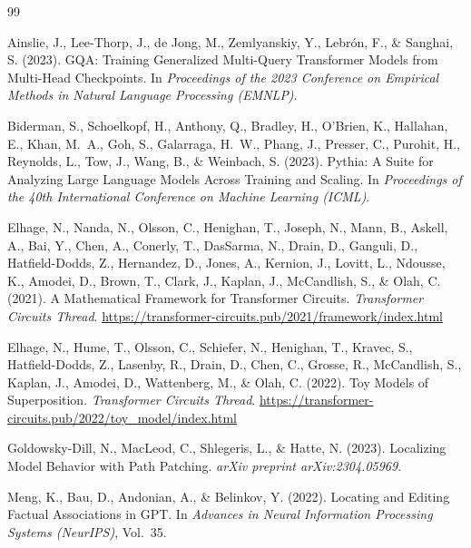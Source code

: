 \documentclass[11pt,a4paper]{article}
\begin{document}

\begin{thebibliography}{99}

Ainslie, J., Lee-Thorp, J., de Jong, M., Zemlyanskiy, Y., Lebrón, F., \& Sanghai, S.
(2023).
GQA: Training Generalized Multi-Query Transformer Models from Multi-Head Checkpoints.
In \emph{Proceedings of the 2023 Conference on Empirical Methods in Natural Language
Processing (EMNLP)}.

Biderman, S., Schoelkopf, H., Anthony, Q., Bradley, H., O'Brien, K., Hallahan, E.,
Khan, M.~A., Goh, S., Galarraga, H.~W., Phang, J., Presser, C., Purohit, H.,
Reynolds, L., Tow, J., Wang, B., \& Weinbach, S.
(2023).
Pythia: A Suite for Analyzing Large Language Models Across Training and Scaling.
In \emph{Proceedings of the 40th International Conference on Machine Learning (ICML)}.

Elhage, N., Nanda, N., Olsson, C., Henighan, T., Joseph, N., Mann, B., Askell, A.,
Bai, Y., Chen, A., Conerly, T., DasSarma, N., Drain, D., Ganguli, D., Hatfield-Dodds,
Z., Hernandez, D., Jones, A., Kernion, J., Lovitt, L., Ndousse, K., Amodei, D.,
Brown, T., Clark, J., Kaplan, J., McCandlish, S., \& Olah, C.
(2021).
A Mathematical Framework for Transformer Circuits.
\emph{Transformer Circuits Thread}.
\url{https://transformer-circuits.pub/2021/framework/index.html}

Elhage, N., Hume, T., Olsson, C., Schiefer, N., Henighan, T., Kravec, S., Hatfield-Dodds,
Z., Lasenby, R., Drain, D., Chen, C., Grosse, R., McCandlish, S., Kaplan, J.,
Amodei, D., Wattenberg, M., \& Olah, C.
(2022).
Toy Models of Superposition.
\emph{Transformer Circuits Thread}.
\url{https://transformer-circuits.pub/2022/toy_model/index.html}

Goldowsky-Dill, N., MacLeod, C., Shlegeris, L., \& Hatte, N.
(2023).
Localizing Model Behavior with Path Patching.
\emph{arXiv preprint arXiv:2304.05969}.

Meng, K., Bau, D., Andonian, A., \& Belinkov, Y.
(2022).
Locating and Editing Factual Associations in GPT.
In \emph{Advances in Neural Information Processing Systems (NeurIPS)}, Vol.~35.


\end{thebibliography}
\end{document}
